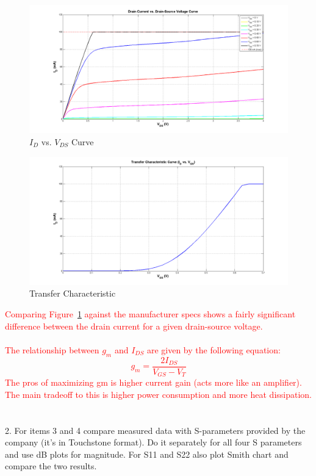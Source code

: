 \documentclass[conference]{IEEEtran}
\begin{document}
\begin{figure}[!h]
\centering
\includegraphics[scale=0.2]{pics/idvsvdds.png}
\caption{$I_{D}$ vs. $V_{DS}$ Curve}
\label{fig:idvsvds}
\end{figure}
\begin{figure}[!h]
\centering
\includegraphics[scale=0.2]{pics/transfercurve.png}
\caption{Transfer Characteristic}
\label{fig:transfercurve}
\end{figure}

\textcolor{red}{Comparing Figure~\ref{fig:idvsvds} against the manufacturer specs shows a fairly significant difference between the drain current for a given drain-source voltage.\\\\
The relationship between $g_m$ and $I_{DS}$ are given by the following equation:
\begin{equation}
g_m = \frac{2I_{DS}}{V_{GS}-V_{T}} 
\end{equation}
The pros of maximizing gm is higher current gain (acts more like an amplifier).  The main tradeoff to this is higher power consumption and more heat dissipation.}\\\\\\
2. For items 3 and 4 compare measured data with S-parameters provided by the company (it's in Touchstone format). Do it separately for all four S parameters and use dB plots for magnitude. For S11 and S22 also plot Smith chart and compare the two results.\\\\\\
\end{document}
